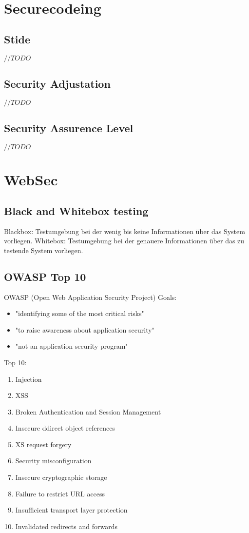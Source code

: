 \documentclass[a4paper, 12pt]{article}
\begin{document}
\section{Securecodeing}
\subsection{Stide}
$ //TODO $
\subsection{Security Adjustation}
$ //TODO $
\subsection{Security Assurence Level}
$ //TODO $

\section{WebSec}
\subsection{Black and Whitebox testing}
	\large Blackbox:
	Testumgebung bei der wenig bis keine Informationen über das System vorliegen.
	\large Whitebox:
	Testumgebung bei der genauere Informationen über das zu testende System vorliegen.
\subsection{OWASP Top 10}
	\large OWASP (Open Web Application Security Project)
	\newbox
	\large Goals:
	\begin{itemize}
		\item "identifying some of the most critical risks"
		\item "to raise awareness about application security"
		\item "not an application security program"
	\end{itemize}
	\newbox
	\large Top 10:
	\begin{enumerate}
		\item Injection
		\item XSS
		\item Broken Authentication and Session Management
		\item Insecure ddirect object references
		\item XS request forgery
		\item Security misconfiguration
		\item Insecure cryptographic storage
		\item Failure to restrict URL access
		\item Insufficient transport layer protection
		\item Invalidated redirects and forwards
	\end{enumerate}
\end{document}
